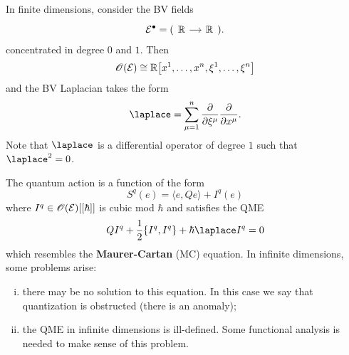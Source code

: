 \begin{example}
  In finite dimensions, consider the BV fields
  \begin{equation*}
    \Ecal^\bullet =
    (\begin{tikzcd}[sep=small]
      \Rbb \arrow[r] & \Rbb
    \end{tikzcd}).
  \end{equation*}
  concentrated in degree $0$ and $1$.
  Then
  \begin{equation*}
    \mathscr{O}(\mathcal{E}) \cong \mathbb{R} \bigl[ x^1, \dots, x^n, \xi^1, \dots, \xi^n \bigr]
  \end{equation*}
  and the BV Laplacian takes the form
  \begin{equation*}
    \laplace = \sum_{\mu = 1}^n \frac{\partial}{\partial \xi^\mu} \frac{\partial}{\partial x^\mu}.
  \end{equation*}
  Note that $\laplace$ is a differential operator of degree $1$ such that $\laplace^2 = 0$.
\end{example}
The quantum action is a function of the form
\begin{equation*}
  S^q(e) = \langle e, Qe \rangle
  + I^q(e)
\end{equation*}
where $I^q \in \mathscr{O}(\mathcal{E}) [[\hbar]]$ is cubic mod $\hbar$ and satisfies the QME
\begin{equation*}
  Q I^q + \frac{1}{2} \{I^q, I^q\} + \hbar \laplace I^q = 0
\end{equation*}
which resembles the \textbf{Maurer-Cartan} (MC) equation. In infinite dimensions, some problems arise:

\begin{enumerate}[i)]
  \item there may be no solution to this equation. In this case we say that quantization is obstructed (there is an anomaly);
  \item the QME in infinite dimensions is ill-defined. Some functional analysis is needed to make sense of this problem.
\end{enumerate}

